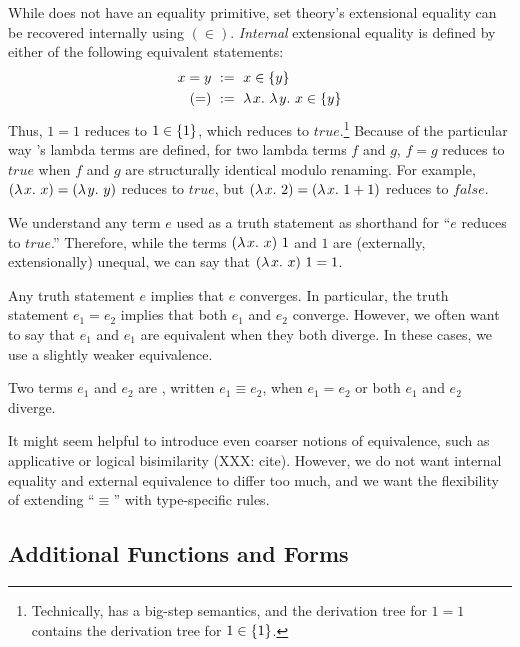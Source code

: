 \documentclass[preprint]{sigplanconf}
\begin{document}
While \lzfclang does not have an equality primitive, set theory's extensional equality can be recovered internally using $(\in)$.
\emph{Internal} extensional equality is defined by either of the following equivalent statements:
\begin{equation}
\begin{aligned}
	x = y &\ := \ x \in \{{y}\} \\
	(=) &\ := \ \lambda\mspace{2mu}{x}\ldotp\,\lambda\mspace{2mu}{y}\ldotp\,{x \in \{{y}\}}
\end{aligned}
\end{equation}
Thus, $1 = 1$ reduces to $1 \in \{{1}\}$, which reduces to $true$.\footnote{Technically, \lzfclang has a big-step semantics, and
the derivation tree for $1 = 1$ contains the derivation tree for $1 \in \{{1}\}$.}
Because of the particular way \lzfclang's lambda terms are defined, for two lambda terms $f$ and $g$, $f = g$ reduces to $true$ when $f$ and $g$ are structurally identical modulo renaming.
For example, $(\lambda\mspace{2mu}{x}\ldotp\,{x}) = (\lambda\mspace{2mu}{y}\ldotp\,{y})$ reduces to $true$, but $(\lambda\mspace{2mu}{x}\ldotp\,{2}) = (\lambda\mspace{2mu}{x}\ldotp\,{1+1})$ reduces to $false$.

We understand any \lzfclang term $\mathit{e}$ used as a truth statement as shorthand for ``$\mathit{e}$ reduces to $true$.''
Therefore, while the terms $(\lambda\mspace{2mu}{x}\ldotp\,{x})~1$ and $1$ are (externally, extensionally) unequal, we can say that $(\lambda\mspace{2mu}{x}\ldotp\,{x})~1 = 1$.

Any truth statement $\mathit{e}$ implies that $\mathit{e}$ converges.
In particular, the truth statement $\mathit{e}_1 = \mathit{e}_2$ implies that both $\mathit{e}_1$ and $\mathit{e}_2$ converge.
However, we often want to say that $\mathit{e}_1$ and $\mathit{e}_1$ are equivalent when they both diverge.
In these cases, we use a slightly weaker equivalence.

\begin{definition}
Two \lzfclang terms $\mathit{e_1}$ and $\mathit{e_2}$ are , written $\mathit{e_1} \equiv \mathit{e_2}$, when $\mathit{e_1} = \mathit{e_2}$ or both $\mathit{e_1}$ and $\mathit{e_2}$ diverge.
\end{definition}

It might seem helpful to introduce even coarser notions of equivalence, such as applicative or logical bisimilarity (XXX: cite).
However, we do not want internal equality and external equivalence to differ too much, and we want the flexibility of extending ``$\equiv$'' with type-specific rules.

\subsection{Additional Functions and Forms}
\end{document}
